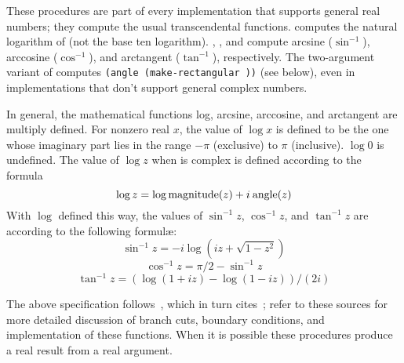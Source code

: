\begin{entry}{%
}

These procedures are part of every implementation that supports
general
real numbers; they compute the usual transcendental functions.  
computes the natural logarithm of  (not the base ten logarithm).
, , and  compute arcsine ($\sin^{-1}$),
arccosine ($\cos^{-1}$), and arctangent ($\tan^{-1}$), respectively.
The two-argument variant of  computes {\tt (angle
(make-rectangular  ))} (see below), even in implementations
that don't support general complex numbers.

In general, the mathematical functions log, arcsine, arccosine, and
arctangent are multiply defined.
For nonzero real $x$, the value of $\log x$ is defined to be
the one whose imaginary part lies in the range $-\pi$ (exclusive) to
$\pi$ (inclusive).  $\log 0$ is undefined.  The value of $\log z$ when
 is complex is defined according to the formula
$$\log z = \log {\rm magnitude}(z) + i \: {\rm angle} (z)$$
With $\log$ defined this way, the values of $\sin^{-1} z$, $\cos^{-1} z$,
and $\tan^{-1} z$ are according to the following formul\ae:
$$\sin^{-1} z = -i \log (i z + \sqrt{1 - z^2})$$
$$\cos^{-1} z = \pi / 2 - \sin^{-1} z$$
$$\tan^{-1} z = (\log (1 + i z) - \log (1 - i z)) / (2 i)$$

The above specification follows~\cite{CLtL}, which in turn
cites~\cite{Penfield81}; refer to these sources for more detailed
discussion of branch cuts, boundary conditions, and implementation of
these functions.  When it is possible these procedures produce a real
result from a real argument.


\end{entry}


